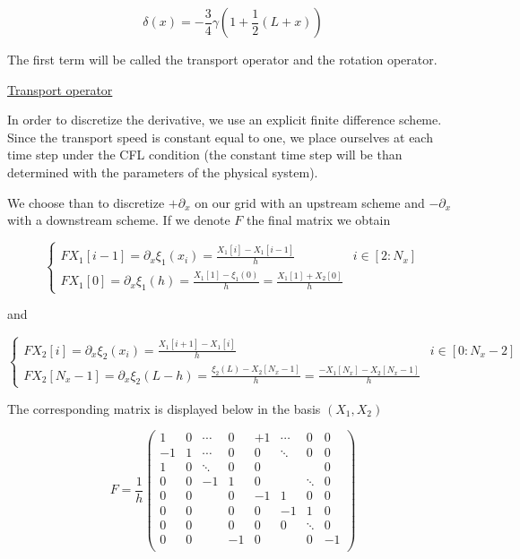 \documentclass[a4paper]{article}
\begin{document}
\[ \delta (x) = -\frac{3}{4} \gamma (1+ \frac{1}{2}(L+x)) \]

The first term will be called the transport operator and the rotation operator.

\vspace{0.5cm}
\underline{Transport operator}

In order to discretize the derivative,
we use an explicit finite difference scheme. 
Since the transport speed is constant equal to one,
we place ourselves at each time step under the CFL condition
(the constant time step will be than determined 
with the parameters of the physical system).

We choose than to discretize $+\partial_x$ 
on our grid with an upstream scheme
and $-\partial_x$ 
with a downstream scheme.
If we denote $F$ the final matrix we obtain

\[
\begin{cases}
	FX_1 [i-1] = \partial_x \xi_1 (x_i) = \frac{X_1[i]-X_1[i-1]}{h} & i \in [2:N_x] \\
	FX_1 [0] = \partial_x \xi_1 (h) = \frac{X_1[1]-\xi_1(0)}{h} = \frac{X_1[1]+ X_2[0]}{h}
\end{cases}
\]

and

\[
\begin{cases}
	FX_2 [i] = \partial_x \xi_2 (x_i) = \frac{X_1[i+1]-X_1[i]}{h} & i \in [0:N_x-2] \\
	FX_2 [N_x-1] = \partial_x \xi_2 (L-h) = \frac{\xi_2(L)-X_2[N_x-1]}{h} = \frac{-X_1[N_x]- X_2[N_x-1]}{h}
\end{cases}
\]

The corresponding matrix is displayed below in the basis $(X_1,X_2)$

\[
F = \frac{1}{h}
\left(
\begin{array}{cccc|cccc}
	1  & 0  & \cdots & 0   &   +1 & \cdots & 0      & 0 \\
	-1 & 1  & \cdots & 0   &    0 & \ddots & 0      & 0\\
	1  & 0  & \ddots & 0   &    0 &        &        & 0\\
	0  & 0  & -1     & 1   &    0 &        & \ddots & 0\\ 
	\hline
    0  & 0  &        & 0   &   -1 &  1     &  0     & 0\\
	0  & 0  &        & 0   &   0  &  -1    &  1     & 0\\
	0  & 0  &        & 0   &   0  &  0     & \ddots & 0\\
	0  & 0  &        & -1  &   0  &        &  0     & -1\\
\end{array}
\right)
\]
\end{document}
